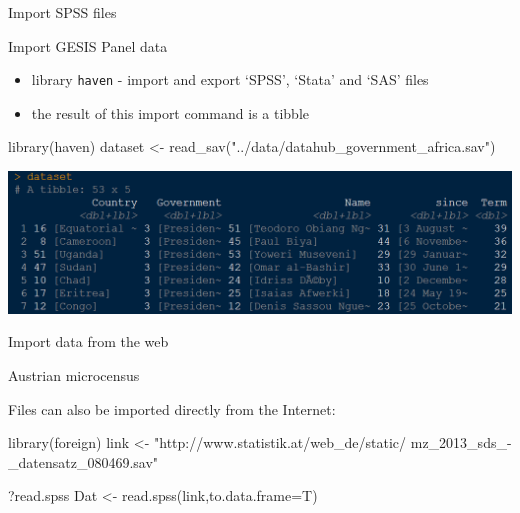 \documentclass[
  10pt,
  ignorenonframetext,
]{beamer}
\newenvironment{Shaded}{\begin{snugshade}}{\end{snugshade}}
\newcommand{\DataTypeTok}[1]{\textcolor[rgb]{0.87,0.87,0.75}{#1}}
\newcommand{\KeywordTok}[1]{\textcolor[rgb]{0.94,0.87,0.69}{#1}}
\newcommand{\NormalTok}[1]{\textcolor[rgb]{0.80,0.80,0.80}{#1}}
\newcommand{\StringTok}[1]{\textcolor[rgb]{0.80,0.58,0.58}{#1}}
\providecommand{\tightlist}{%
  \setlength{\itemsep}{0pt}\setlength{\parskip}{0pt}}
\begin{document}
\begin{frame}[fragile]{Import SPSS files}
\protect\hypertarget{import-spss-files}{}

\begin{block}{Import GESIS Panel data}

\begin{itemize}
\tightlist
\item
  library \texttt{haven} - import and export `SPSS', `Stata' and `SAS'
  files
\item
  the result of this import command is a tibble
\end{itemize}

\begin{Shaded}
\begin{Highlighting}[]
\KeywordTok{library}\NormalTok{(haven)}
\NormalTok{dataset <-}\StringTok{ }\KeywordTok{read_sav}\NormalTok{(}\StringTok{"../data/datahub_government_africa.sav"}\NormalTok{)}
\end{Highlighting}
\end{Shaded}

\includegraphics{figure/governmentdata_africa.PNG}

\end{block}

\end{frame}

\begin{frame}[fragile]{Import data from the web}
\protect\hypertarget{import-data-from-the-web}{}

\begin{block}{Austrian microcensus}

Files can also be imported directly from the Internet:

\begin{Shaded}
\begin{Highlighting}[]
\KeywordTok{library}\NormalTok{(foreign)}
\NormalTok{link <-}\StringTok{ "http://www.statistik.at/web_de/static/}
\StringTok{mz_2013_sds_-_datensatz_080469.sav"}

\NormalTok{?read.spss}
\NormalTok{Dat <-}\StringTok{ }\KeywordTok{read.spss}\NormalTok{(link,}\DataTypeTok{to.data.frame=}\NormalTok{T)}
\end{Highlighting}
\end{Shaded}

\end{block}

\end{frame}
\end{document}
